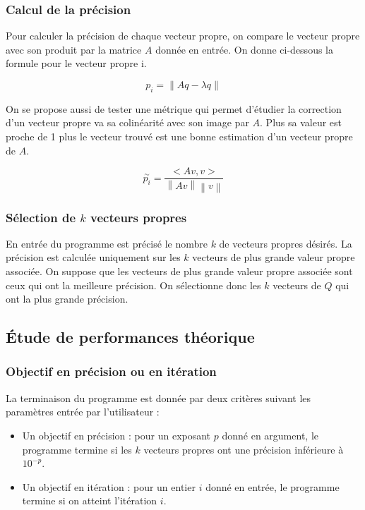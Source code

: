 \documentclass[11pt,a4paper]{article}
\newcommand{\norm}[1]{\left\lVert#1\right\rVert}
\begin{document}
		\subsubsection{Calcul de la précision}

			Pour calculer la précision de chaque vecteur propre, on compare le vecteur propre avec son produit par la matrice $A$ donnée en entrée. On donne ci-dessous la formule pour le vecteur propre i.

			$$
			p_i = \norm{Aq-\lambda q}
			$$

			On se propose aussi de tester une métrique qui permet d'étudier la correction d'un vecteur propre va sa colinéarité avec son image par $A$. Plus sa valeur est proche de 1 plus le vecteur trouvé est une bonne estimation d'un vecteur propre de $A$.

			$$
			\overset{\sim}{p_i} = \frac{<Av, v>}{\norm{Av}\norm{v}}
			$$

		\subsubsection{Sélection de $k$ vecteurs propres}

			En entrée du programme est précisé le nombre $k$ de vecteurs propres désirés. La précision est calculée uniquement sur les $k$ vecteurs de plus grande valeur propre associée. On suppose que les vecteurs de plus grande valeur propre associée sont ceux qui ont la meilleure précision. On sélectionne donc les $k$ vecteurs de $Q$ qui ont la plus grande précision.

	\subsection{Étude de performances théorique}
		
		\subsubsection{Objectif en précision ou en itération}
			
			La terminaison du programme est donnée par deux critères suivant les paramètres entrée par l'utilisateur :
			\begin{itemize}
				\item Un objectif en précision : pour un exposant $p$ donné en argument, le programme termine si les $k$ vecteurs propres ont une précision inférieure à $10^{-p}$.
				\item Un objectif en itération : pour un entier $i$ donné en entrée, le programme termine si on atteint l'itération $i$.
			\end{itemize}
\end{document}
